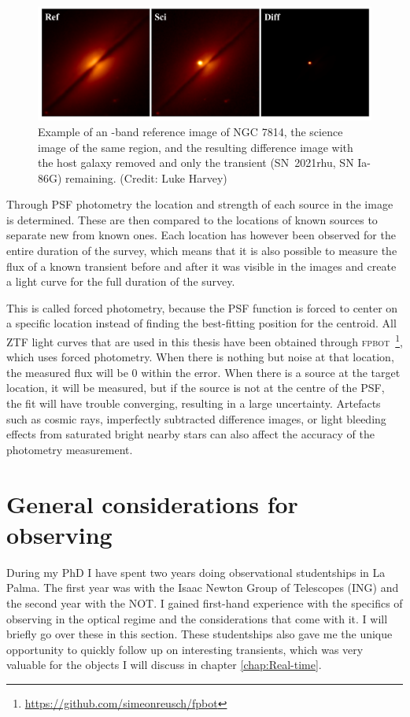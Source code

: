 \documentclass[a4paper,oneside,12pt, class=Latex/Classes/PhDthesisPSnPDF, crop=false]{standalone}
\begin{document}
\begin{figure}
    \centering
    \includegraphics[width=\textwidth]{../Images/chapter_2/diff_im_SN2021rhu.png}
    \caption{Example of an \ztfr-band reference image of NGC 7814, the science image of the same region, and the resulting difference image with the host galaxy removed and only the transient (SN~2021rhu, SN Ia-86G) remaining. (Credit: Luke Harvey)}
    \label{diff_im_example}
\end{figure}

Through PSF photometry the location and strength of each source in the image is determined. These are then compared to the locations of known sources to separate new from known ones. Each location has however been observed for the entire duration of the survey, which means that it is also possible to measure the flux of a known transient before and after it was visible in the images and create a light curve for the full duration of the survey.

This is called forced photometry, because the PSF function is forced to center on a specific location instead of finding the best-fitting position for the centroid. All ZTF light curves that are used in this thesis have been obtained through \textsc{fpbot} \citep{fpbot}\,\footnote{\url{https://github.com/simeonreusch/fpbot}}, which uses forced photometry. When there is nothing but noise at that location, the measured flux will be 0 within the error. When there is a source at the target location, it will be measured, but if the source is not at the centre of the PSF, the fit will have trouble converging, resulting in a large uncertainty. Artefacts such as cosmic rays, imperfectly subtracted difference images, or light bleeding effects from saturated bright nearby stars can also affect the accuracy of the photometry measurement.


\section{General considerations for observing}
\label{considerations}
During my PhD I have spent two years doing observational studentships in La Palma. The first year was with the Isaac Newton Group of Telescopes (ING) and the second year with the NOT. I gained first-hand experience with the specifics of observing in the optical regime and the considerations that come with it. I will briefly go over these in this section. These studentships also gave me the unique opportunity to quickly follow up on interesting transients, which was very valuable for the objects I will discuss in chapter \ref{chap:Real-time}.
\end{document}
